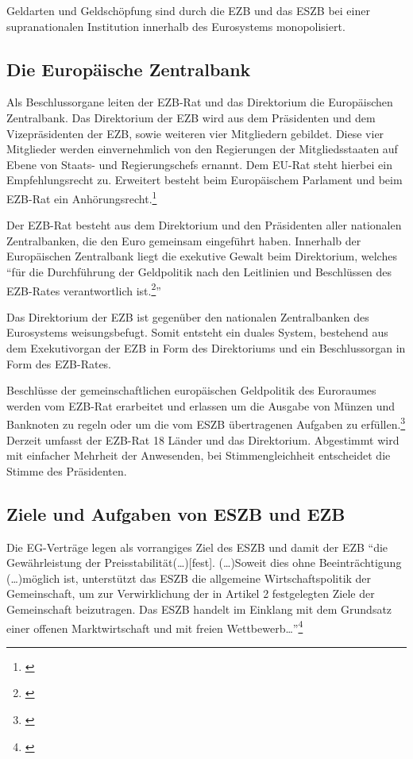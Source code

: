 \documentclass[
        onecolumn,
        a4paper,
        abstracton,
        parskip=half
        ,final
        ]{scrartcl}
\begin{document}
Geldarten und Geldsch{\"o}pfung sind durch die EZB und das ESZB bei einer supranationalen Institution innerhalb des Eurosystems monopolisiert.



\subsection{Die Europ{\"a}ische Zentralbank}
Als Beschlussorgane leiten der EZB-Rat und das Direktorium die Europ{\"a}ischen Zentralbank. Das Direktorium der \ac{EZB} wird aus dem Pr{\"a}sidenten und dem Vizepr{\"a}sidenten der EZB, sowie weiteren vier Mitgliedern gebildet. Diese vier Mitglieder werden einvernehmlich von den Regierungen der Mitgliedsstaaten auf Ebene von Staats- und Regierungschefs ernannt. Dem EU-Rat steht hierbei ein Empfehlungsrecht zu. Erweitert besteht beim Europ{\"a}ischem Parlament und beim EZB-Rat ein Anh{\"o}rungsrecht.\footnote[46]{\citep*[vgl.][S.553]{Basseler2010}}

Der EZB-Rat besteht aus dem Direktorium und den Pr{\"a}sidenten aller nationalen Zentralbanken, die den Euro gemeinsam eingef{\"u}hrt haben. Innerhalb der Europ{\"a}ischen Zentralbank liegt die exekutive Gewalt beim Direktorium, welches "`f{\"u}r die Durchf{\"u}hrung der Geldpolitik nach den Leitlinien und Beschl{\"u}ssen des EZB-Rates verantwortlich ist.\footnote[47]{\citep*[S.553]{Basseler2010}}"'

Das Direktorium der \ac{EZB} ist gegen{\"u}ber den nationalen Zentralbanken des Eurosystems weisungsbefugt. Somit entsteht ein duales System, bestehend aus dem Exekutivorgan der EZB in Form des Direktoriums und ein Beschlussorgan in Form des EZB-Rates.

Beschl{\"u}sse der gemeinschaftlichen europ{\"a}ischen Geldpolitik des Euroraumes werden vom EZB-Rat erarbeitet und erlassen um die Ausgabe von M{\"u}nzen und Banknoten zu regeln oder um die vom \ac{ESZB} {\"u}bertragenen Aufgaben zu erf{\"u}llen.\footnote[100]{\citep*[vgl.][S.553]{Basseler2010}}
Derzeit umfasst der EZB-Rat 18 L{\"a}nder und das Direktorium. Abgestimmt wird mit einfacher Mehrheit der Anwesenden, bei Stimmengleichheit entscheidet die Stimme des Pr{\"a}sidenten.


\subsection{Ziele und Aufgaben von ESZB und EZB}  %
Die EG-Vertr{\"a}ge legen als vorrangiges Ziel des \ac{ESZB} und damit der EZB "`die Gew{\"a}hrleistung der Preisstabilit{\"a}t(\ldots)[fest]. (\ldots)Soweit dies ohne Beeintr{\"a}chtigung (\ldots)m{\"o}glich ist, unterst{\"u}tzt das ESZB die allgemeine Wirtschaftspolitik der Gemeinschaft, um zur Verwirklichung der in Artikel 2 festgelegten Ziele der Gemeinschaft beizutragen. Das ESZB handelt im Einklang mit dem Grundsatz einer offenen Marktwirtschaft und mit freien Wettbewerb\ldots"'\footnote[48]{\citep*[vgl.][S.554]{Basseler2010}}
\end{document}
